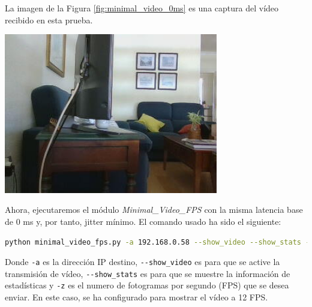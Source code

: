\newpage
La imagen de la Figura \ref{fig:minimal_video_0ms} es una captura del vídeo recibido en esta prueba.
\begin{center}
  \includegraphics[width = 0.7\textwidth]{images/VideoRecibido4.1.png}
  \label{fig:minimal_video}
\end{center}

\newpage

Ahora, ejecutaremos el módulo \textit{Minimal\_Video\_FPS} con la misma latencia base de 0 ms y, por tanto, jitter mínimo. El comando usado ha sido el siguiente:

\begin{lstlisting}[language=bash, basicstyle=\ttfamily\scriptsize]
    python minimal_video_fps.py -a 192.168.0.58 --show_video --show_stats -z 12
\end{lstlisting}
Donde \verb|-a| es la dirección IP destino, \verb|--show_video| es para que se active la transmisión de vídeo, \verb|--show_stats| es para que se muestre la información de estadísticas y \verb|-z| es el numero de fotogramas por segundo (FPS) que se desea enviar. En este caso, se ha configurado para mostrar el vídeo a 12 FPS.
\vspace{\baselineskip}


